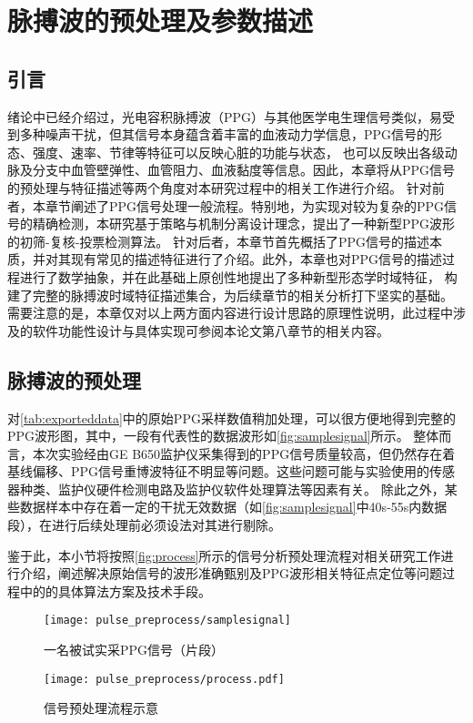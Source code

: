 \chapter{脉搏波的预处理及参数描述}
\section{引言}
绪论中已经介绍过，光电容积脉搏波（PPG）与其他医学电生理信号类似，易受到多种噪声干扰，但其信号本身蕴含着丰富的血液动力学信息，PPG信号的形态、强度、速率、节律等特征可以反映心脏的功能与状态，
也可以反映出各级动脉及分支中血管壁弹性、血管阻力、血液黏度等信息。因此，本章将从PPG信号的预处理与特征描述等两个角度对本研究过程中的相关工作进行介绍。
针对前者，本章节阐述了PPG信号处理一般流程。特别地，为实现对较为复杂的PPG信号的精确检测，本研究基于策略与机制分离设计理念，提出了一种新型PPG波形的初筛-复核-投票检测算法。
针对后者，本章节首先概括了PPG信号的描述本质，并对其现有常见的描述特征进行了介绍。此外，本章也对PPG信号的描述过程进行了数学抽象，并在此基础上原创性地提出了多种新型形态学时域特征，
构建了完整的脉搏波时域特征描述集合，为后续章节的相关分析打下坚实的基础。
需要注意的是，本章仅对以上两方面内容进行设计思路的原理性说明，此过程中涉及的软件功能性设计与具体实现可参阅本论文第八章节的相关内容。
\section{脉搏波的预处理}
对\autoref{tab:exporteddata}中的原始PPG采样数值稍加处理，可以很方便地得到完整的PPG波形图，其中，一段有代表性的数据波形如\autoref{fig:samplesignal}所示。
整体而言，本次实验经由GE B650监护仪采集得到的PPG信号质量较高，但仍然存在着基线偏移、PPG信号重博波特征不明显等问题。这些问题可能与实验使用的传感器种类、监护仪硬件检测电路及监护仪软件处理算法等因素有关。
除此之外，某些数据样本中存在着一定的干扰无效数据（如\autoref{fig:samplesignal}中40s-55s内数据段），在进行后续处理前必须设法对其进行剔除。

鉴于此，本小节将按照\autoref{fig:process}所示的信号分析预处理流程对相关研究工作进行介绍，阐述解决原始信号的波形准确甄别及PPG波形相关特征点定位等问题过程中的的具体算法方案及技术手段。
\begin{figure}[htbp]
    \centering
    \texttt{[image: pulse\_preprocess/samplesignal]}
    \caption{\label{fig:samplesignal}一名被试实采PPG信号（片段）}
\end{figure}
\begin{figure}[htbp]
    \centering
    \texttt{[image: pulse\_preprocess/process.pdf]}
    \caption{\label{fig:process}信号预处理流程示意}
\end{figure}

